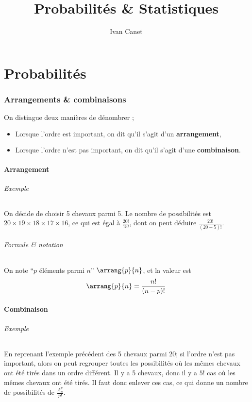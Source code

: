 \documentclass[10pt,a4paper,french]{article}
\begin{document}
\title{Probabilités \& Statistiques}
\author{Ivan Canet}
\maketitle

\tableofcontents

\part{Probabilités}

\section{Arrangements \& combinaisons}

On distingue deux manières de dénombrer ;

\begin{itemize}
\item Lorsque l'ordre est important, on dit qu'il s'agit d'un \textbf{arrangement},
\item Lorsque l'ordre n'est pas important, on dit qu'il s'agit d'une \textbf{combinaison}.
\end{itemize}

\subsection{Arrangement}

\paragraph{Exemple}
On décide de choisir 5 chevaux parmi 5. Le nombre de possibilités est $20 \times 19 \times 18 \times 17 \times 16$, ce qui est égal à $\frac{20!}{15!}$, dont on peut déduire $\frac{20!}{(20-5)!}$.

\paragraph{Formule \& notation}
On note ``$p$ éléments parmi $n$'' $\arrang{p}{n}$, et la valeur est \[ \arrang{p}{n} = \frac{n!}{(n-p)!} \]

\subsection{Combinaison}

\paragraph{Exemple}
En reprenant l'exemple précédent des 5 chevaux parmi 20; si l'ordre n'est pas important, alors on peut regrouper toutes les possibilités où les mêmes chevaux ont été tirés dans un ordre différent. Il y a 5 chevaux, donc il y a $5!$ cas où les mêmes chevaux ont été tirés. Il faut donc enlever ces cas, ce qui donne un nombre de possibilités de $\frac{A_n^p}{p!}$.
\end{document}
